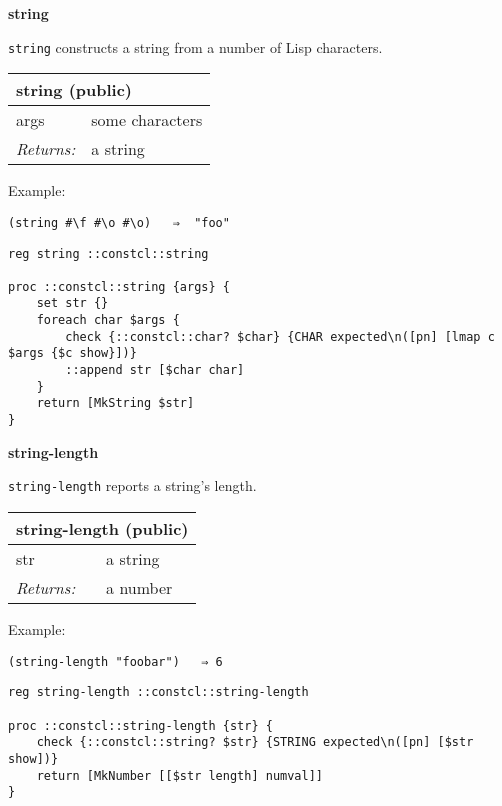 \documentclass{report}
\begin{document}
\textbf{string}


\texttt{string} constructs a string from a number of Lisp characters.

\begin{tabular}{ |l l| }
\hline
\multicolumn{2}{|l|}{string (public)} \\
\hline
args & some characters \\
\textit{Returns:} & a string \\
\hline
\end{tabular}


Example:

\noindent\makebox[\linewidth]{\rule{\linewidth}{0.4pt}}
\begin{lstlisting}
(string #\f #\o #\o)   ⇒  "foo"
\end{lstlisting}
\noindent\makebox[\linewidth]{\rule{\linewidth}{0.4pt}}
\noindent\makebox[\linewidth]{\rule{\linewidth}{0.4pt}}
\begin{lstlisting}
reg string ::constcl::string
 
proc ::constcl::string {args} {
    set str {}
    foreach char $args {
        check {::constcl::char? $char} {CHAR expected\n([pn] [lmap c $args {$c show}])}
        ::append str [$char char]
    }
    return [MkString $str]
}
\end{lstlisting}
\noindent\makebox[\linewidth]{\rule{\linewidth}{0.4pt}}

\textbf{string-length}


\texttt{string-length} reports a string's length.

\begin{tabular}{ |l l| }
\hline
\multicolumn{2}{|l|}{string-length (public)} \\
\hline
str & a string \\
\textit{Returns:} & a number \\
\hline
\end{tabular}


Example:

\noindent\makebox[\linewidth]{\rule{\linewidth}{0.4pt}}
\begin{lstlisting}
(string-length "foobar")   ⇒ 6
\end{lstlisting}
\noindent\makebox[\linewidth]{\rule{\linewidth}{0.4pt}}
\noindent\makebox[\linewidth]{\rule{\linewidth}{0.4pt}}
\begin{lstlisting}
reg string-length ::constcl::string-length
 
proc ::constcl::string-length {str} {
    check {::constcl::string? $str} {STRING expected\n([pn] [$str show])}
    return [MkNumber [[$str length] numval]]
}
\end{lstlisting}
\noindent\makebox[\linewidth]{\rule{\linewidth}{0.4pt}}
\end{document}
